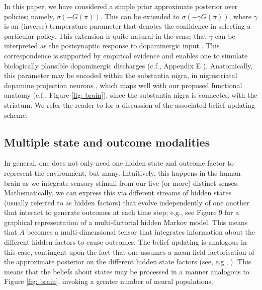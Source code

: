 \documentclass{article}
\begin{document}
In this paper, we have considered a simple prior approximate posterior over policies; namely, $\sigma (-G(\pi))$. This can be extended to $\sigma (-\gamma G(\pi))$, where $\gamma$ is an (inverse) temperature parameter that denotes the confidence in selecting a particular policy. This extension is quite natural in the sense that $\gamma$ can be interpreted as the postsynaptic response to dopaminergic input \cite{fitzgeraldDopamineRewardLearning2015,fristonAnatomyChoiceDopamine2014}. This correspondence is supported by empirical evidence \cite{schwartenbeckDopaminergicMidbrainEncodes2015} and enables one to simulate biologically plausible dopaminergic discharges (c.f., Appendix E \cite{fristonActiveInferenceProcess2017}). Anatomically, this parameter may be encoded within the substantia nigra, in nigrostriatal dopamine projection neurons \cite{schwartenbeckDopaminergicMidbrainEncodes2015}, which maps well with our proposed functional anatomy (c.f., Figure \ref{fig: brain}), since the substantia nigra is connected with the striatum. We refer the reader to \cite{fristonActiveInferenceProcess2017} for a discussion of the associated belief updating scheme.

 
\subsection{Multiple state and outcome modalities}
\label{appendix: multiple state outcome}

In general, one does not only need one hidden state and outcome factor to represent the environment, but many. Intuitively, this happens in the human brain as we integrate sensory stimuli from our five (or more) distinct senses. Mathematically, we can express this via different streams of hidden states (usually referred to as hidden factors) that evolve independently of one another that interact to generate outcomes at each time step; e.g., see Figure 9 \cite{jordanIntroductionVariationalMethods1998} for a graphical representation of a multi-factorial hidden Markov model. This means that $A$ becomes a multi-dimensional tensor that integrates information about the different hidden factors to cause outcomes. The belief updating is analogous in this case, contingent upon the fact that one assumes a mean-field factorisation of the approximate posterior on the different hidden state factors (see, e.g., \cite{mirzaSceneConstructionVisual2016,fristonFunctionalAnatomyTime2016}). This means that the beliefs about states may be processed in a manner analogous to Figure \ref{fig: brain}, invoking a greater number of neural populations.
\end{document}

